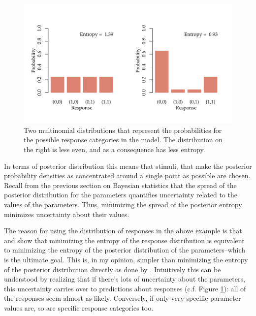 \documentclass{article}\usepackage{knitr}
\begin{document}
\begin{figure}
\begin{center}
\begin{knitrout}
\color{fgcolor}
\includegraphics[width=\maxwidth]{figure/unnamed-chunk-14-1} 

\end{knitrout}
\end{center}
\caption{Two multinomial distributions that represent the probabilities for the possible response categories in the model. The distribution on the right is less even, and as a consequence has less entropy.}
\label{fig:entropy}
\end{figure}

In terms of posterior distribution this means that stimuli, that make the posterior probability densities as concentrated around a single point as possible are chosen. Recall from the previous section on Bayesian statistics that the spread of the posterior distribution for the parameters quantifies uncertainty related to the values of the parameters. Thus, minimizing the spread of the posterior entropy minimizes uncertainty about their values. 

The reason for using the distribution of responses in the above example is that \citet{kujalalukka2006} and \citet{kujala2011} show that minimizing the entropy of the response distribution is equivalent to minimizing the entropy of the posterior distribution of the parameters--which is the ultimate goal. This is, in my opinion, simpler than minimizing the entropy of the posterior distribution directly as done by \citet{kontsevichtyler1999}. Intuitively this can be understood by realizing that if there's lots of uncertainty about the parameters, this uncertainty carries over to predictions about responses (c.f. Figure \ref{fig:entropy}): all of the responses seem almost as likely. Conversely, if only very specific parameter values are, so are specific response categories too. 
\end{document}
